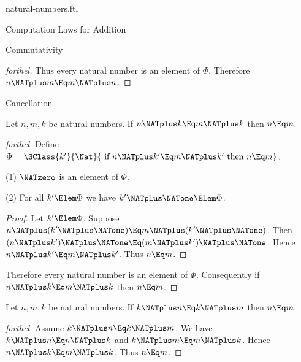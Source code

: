 \documentclass{stex}
\begin{document}
\begin{smodule}{natural-numbers.ftl}
\begin{sfragment}{Computation Laws for Addition}
\begin{sfragment}{Commutativity}
\begin{proof}[forthel]
      Thus every natural number is an element of $\Phi$.
      Therefore $n \NATplus m \Eq m \NATplus n$.
    \end{proof}
  \end{sfragment}

  \begin{sfragment}{Cancellation}
    

    \begin{proposition}[forthel,name=right-cancellability of addition]
      Let $n, m, k$ be natural numbers.
      If $n \NATplus k \Eq m \NATplus k$ then $n \Eq m$.
    \end{proposition}
    \begin{proof}[forthel]
      Define $\Phi = \SClass{k'}{\Nat}{\text{ if }n \NATplus k' \Eq m \NATplus k'\text{ then }n \Eq m}$.

      (1) $\NATzero$ is an element of $\Phi$.

      (2) For all $k' \Elem \Phi$ we have $k' \NATplus \NATone \Elem \Phi$.
      \begin{proof}
        Let $k' \Elem \Phi$.
        Suppose $n \NATplus (k' \NATplus \NATone) \Eq m \NATplus (k' \NATplus \NATone)$.
        Then $(n \NATplus k') \NATplus \NATone \Eq (m \NATplus k') \NATplus \NATone$.
        Hence $n \NATplus k' \Eq m \NATplus k'$.
        Thus $n \Eq m$.
      \end{proof}

      Therefore every natural number is an element of $\Phi$.
      Consequently if $n \NATplus k \Eq m \NATplus k$ then $n \Eq m$.
    \end{proof}


    \begin{corollary}[forthel,name=left-cancellability of addition]
      Let $n, m, k$ be natural numbers.
      If $k \NATplus n \Eq k \NATplus m$ then $n \Eq m$.
    \end{corollary}
    \begin{proof}[forthel]
      Assume $k \NATplus n \Eq k \NATplus m$.
      We have $k \NATplus n \Eq n \NATplus k$ and $k \NATplus m \Eq m \NATplus k$.
      Hence $n \NATplus k \Eq m \NATplus k$.
      Thus $n \Eq m$.
    \end{proof}
  \end{sfragment}


\end{sfragment}
\end{smodule}
\end{document}
